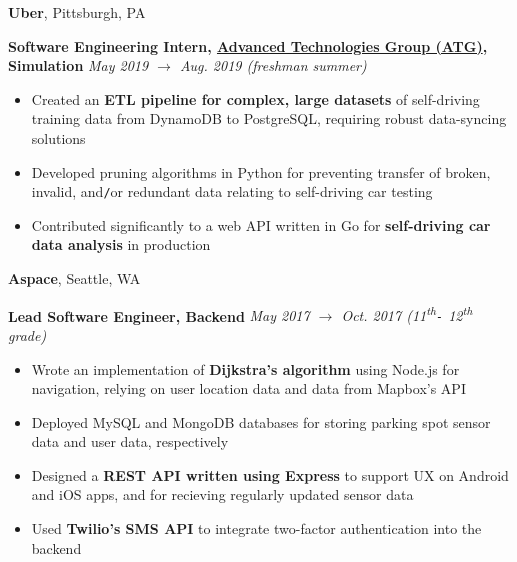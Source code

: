 \documentclass[10pt]{article}
\begin{document}
\begin{flushleft}
		\vspace{-1.50mm}
		\textbf{Uber}, {\small Pittsburgh, PA}\\
		\begin{leftli}
			{\small \textbf{Software Engineering Intern, \href{https://www.uber.com/us/en/atg/research-and-development/perception-and-prediction/}{Advanced Technologies Group (ATG)}, Simulation}} \hfill \textit{\small May 2019 $\rightarrow$ Aug. 2019 (freshman summer)}\\
			\begin{itemize}
				\item Created an \textbf{ETL pipeline for complex, large datasets} of self-driving training data from DynamoDB to PostgreSQL, requiring robust data-syncing solutions
				\vspace{-2mm}
				\item Developed pruning algorithms in Python for preventing transfer of broken, invalid, and\texttt{/}or redundant data relating to self-driving car testing
				\vspace{-2mm}
      \item Contributed significantly to a web API written in Go for \textbf{self-driving car data analysis} in production
			\end{itemize}
		\end{leftli}

		\vspace{-1.50mm}
		\textbf{Aspace}, {\small Seattle, WA}\\
		\begin{leftli}
			{\small \textbf{Lead Software Engineer, Backend}} \hfill \textit{\small May 2017 $\rightarrow$ Oct. 2017 (11\textsuperscript{th}\texttt{-} 12\textsuperscript{th} grade)}

			\begin{itemize}
				\item Wrote an implementation of \textbf{Dijkstra's algorithm} using Node.js for navigation, relying on user location data and data from Mapbox's API
				\vspace{-2mm}
				\item Deployed MySQL and MongoDB databases for storing parking spot sensor data and user data, respectively
				\vspace{-2mm}
			\item Designed a \textbf{REST API written using Express} to support UX on Android and iOS apps, and for recieving regularly updated sensor data
				\vspace{-2mm}
			\item Used \textbf{Twilio's SMS API} to integrate two-factor authentication into the backend
			\end{itemize}
		\end{leftli}



\end{flushleft}
\end{document}
